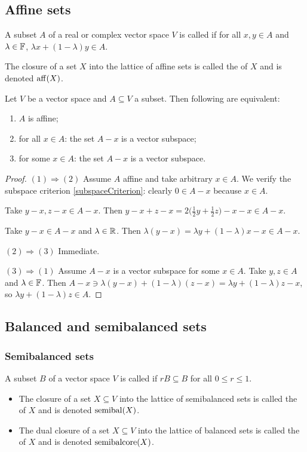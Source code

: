 \subsection{Affine sets}
\begin{definition}
A subset $A$ of a real or complex vector space $V$ is called  if for all $x,y\in A$ and $\lambda\in\mathbb{F}$, $\lambda x + (1-\lambda)y\in A$.

The closure of a set $X$ into the lattice of affine sets is called the  of $X$ and is denoted $\operatorname{aff}(X)$.
\end{definition}

\begin{proposition}
Let $V$ be a vector space and $A\subseteq V$ a subset. Then following are equivalent:
\begin{enumerate}
\item $A$ is affine;
\item for all $x\in A$: the set $A-x$ is a vector subspace;
\item for some $x\in A$: the set $A-x$ is a vector subspace.
\end{enumerate}
\end{proposition}
\begin{proof}
$(1) \Rightarrow (2)$ Assume $A$ affine and take arbitrary $x\in A$. We verify the subspace criterion \ref{subspaceCriterion}: clearly $0\in A-x$ because $x\in A$.

Take $y-x, z-x \in A-x$. Then $y-x + z-x = 2\Big(\frac{1}{2}y + \frac{1}{2}z\Big) - x -x \in A-x$.

Take $y-x\in A-x$ and $\lambda\in \mathbb{R}$. Then $\lambda(y-x) = \lambda y + (1-\lambda)x - x \in A-x$.

$(2) \Rightarrow (3)$ Immediate.

$(3) \Rightarrow (1)$ Assume $A-x$ is a vector subspace for some $x\in A$. Take $y,z\in A$ and $\lambda\in \mathbb{F}$. Then $A-x \ni \lambda(y-x)+(1-\lambda)(z-x) = \lambda y + (1-\lambda)z - x$, so $\lambda y + (1-\lambda)z \in A$. 
\end{proof}


\subsection{Balanced and semibalanced sets}
\subsubsection{Semibalanced sets}
\begin{definition}
A subset $B$ of a vector space $V$ is called  if $rB \subseteq B$ for all $0\leq r \leq 1$.

\begin{itemize}
\item The closure of a set $X\subseteq V$ into the lattice of semibalanced sets is called the  of $X$ and is denoted $\operatorname{semibal}(X)$.
\item The dual closure of a set $X\subseteq V$ into the lattice of balanced sets is called the  of $X$ and is denoted $\operatorname{semibalcore}(X)$.
\end{itemize}
\end{definition}

